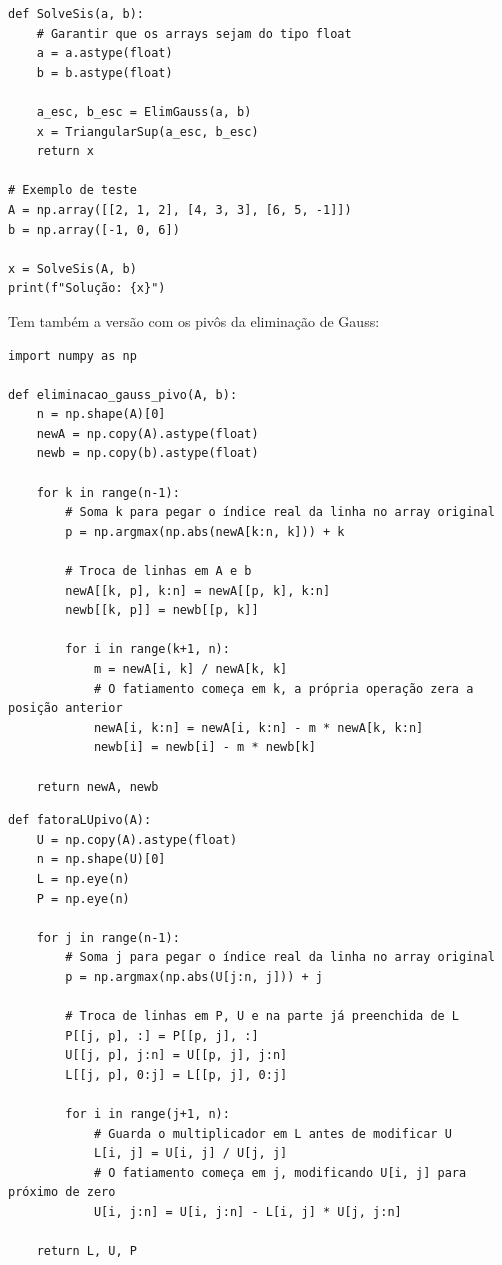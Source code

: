 \documentclass[../numerical_methods.tex]{subfiles}
\begin{document}
\begin{listing}[H]
	\begin{verbatim}
def SolveSis(a, b):
    # Garantir que os arrays sejam do tipo float
    a = a.astype(float)
    b = b.astype(float)

    a_esc, b_esc = ElimGauss(a, b)
    x = TriangularSup(a_esc, b_esc)
    return x

# Exemplo de teste
A = np.array([[2, 1, 2], [4, 3, 3], [6, 5, -1]])
b = np.array([-1, 0, 6])

x = SolveSis(A, b)
print(f"Solução: {x}")
\end{verbatim}
\end{listing}
Tem também a versão com os pivôs da eliminação de Gauss:
\begin{listing}[H]
	\caption{Eliminação de Gauss: matriz pós Pivôs}
	\begin{verbatim}
import numpy as np

def eliminacao_gauss_pivo(A, b):
    n = np.shape(A)[0]
    newA = np.copy(A).astype(float)
    newb = np.copy(b).astype(float)

    for k in range(n-1):
        # Soma k para pegar o índice real da linha no array original
        p = np.argmax(np.abs(newA[k:n, k])) + k

        # Troca de linhas em A e b
        newA[[k, p], k:n] = newA[[p, k], k:n]
        newb[[k, p]] = newb[[p, k]]

        for i in range(k+1, n):
            m = newA[i, k] / newA[k, k]
            # O fatiamento começa em k, a própria operação zera a posição anterior
            newA[i, k:n] = newA[i, k:n] - m * newA[k, k:n]
            newb[i] = newb[i] - m * newb[k]

    return newA, newb
  \end{verbatim}
	\begin{verbatim}
def fatoraLUpivo(A):
    U = np.copy(A).astype(float)
    n = np.shape(U)[0]
    L = np.eye(n)
    P = np.eye(n)

    for j in range(n-1):
        # Soma j para pegar o índice real da linha no array original
        p = np.argmax(np.abs(U[j:n, j])) + j

        # Troca de linhas em P, U e na parte já preenchida de L
        P[[j, p], :] = P[[p, j], :]
        U[[j, p], j:n] = U[[p, j], j:n]
        L[[j, p], 0:j] = L[[p, j], 0:j]

        for i in range(j+1, n):
            # Guarda o multiplicador em L antes de modificar U
            L[i, j] = U[i, j] / U[j, j]
            # O fatiamento começa em j, modificando U[i, j] para próximo de zero
            U[i, j:n] = U[i, j:n] - L[i, j] * U[j, j:n]

    return L, U, P
\end{verbatim}
\end{listing}
\end{document}
